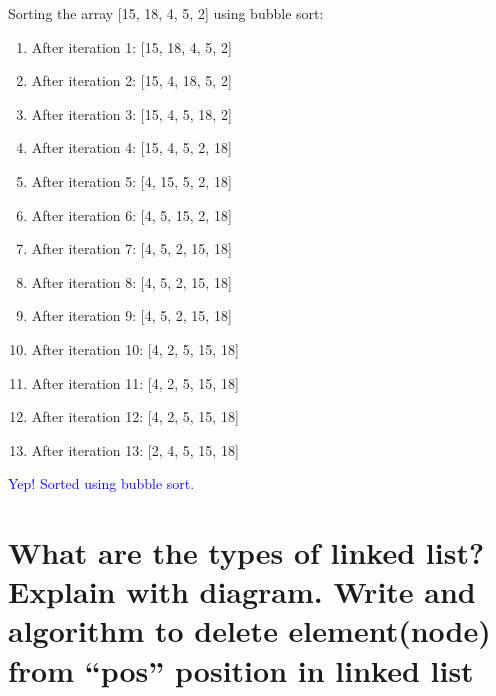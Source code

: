 \documentclass[11 pt]{article}
\begin{document}
Sorting the array [15, 18, 4, 5, 2] using bubble sort:
\begin{enumerate}
	\item After iteration 1: [15, 18, 4, 5, 2]
	\item After iteration 2: [15, 4, 18, 5, 2]
	\item After iteration 3: [15, 4, 5, 18, 2]
	\item After iteration 4: [15, 4, 5, 2, 18]
	\item After iteration 5: [4, 15, 5, 2, 18]
	\item After iteration 6: [4, 5, 15, 2, 18]
	\item After iteration 7: [4, 5, 2, 15, 18]
	\item After iteration 8: [4, 5, 2, 15, 18]
	\item After iteration 9: [4, 5, 2, 15, 18]
	\item After iteration 10: [4, 2, 5, 15, 18]
	\item After iteration 11: [4, 2, 5, 15, 18]
	\item After iteration 12: [4, 2, 5, 15, 18]
	\item After iteration 13: [2, 4, 5, 15, 18]
\end{enumerate}
\textcolor{blue}{Yep! Sorted using bubble sort.}

\pagebreak

\section{What are the types of linked list? Explain with diagram. Write and algorithm to delete element(node) from \enquote{pos} position in linked list}
\end{document}
